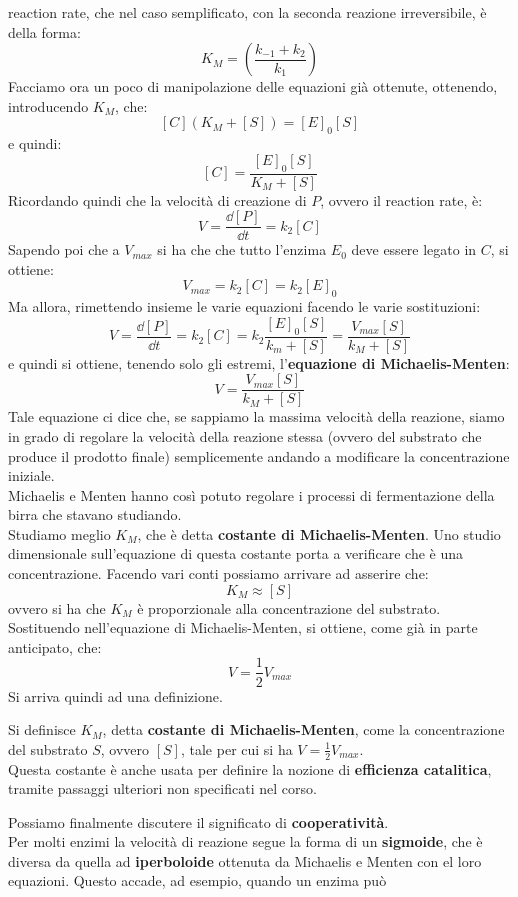 \documentclass[a4paper,12pt, oneside]{book}
\begin{document}
reaction rate, che nel caso semplificato, con la seconda reazione irreversibile,
è della forma:
\[K_M=\left(\frac{k_{-1}+k_2}{k_1}\right)\]
Facciamo ora un poco di manipolazione delle equazioni già ottenute, ottenendo,
introducendo $K_M$, che:
\[[C](K_M+[S])=[E]_0[S]\]
e quindi:
\[[C]=\frac{[E]_0[S]}{K_M+[S]}\]
Ricordando quindi che la velocità di creazione di $P$, ovvero il reaction rate,
è:
\[V=\frac{\dd{[P]}}{\dd{t}}=k_2[C]\]
Sapendo poi che a $V_{max}$ si ha che che tutto l'enzima $E_0$ deve essere
legato in $C$, si ottiene:
\[V_{max}=k_2[C]=k_2[E]_0\]
Ma allora, rimettendo insieme le varie equazioni facendo le varie sostituzioni:
\[V=\frac{\dd{[P]}}{\dd{t}}=k_2[C]=k_2\frac{[E]_0[S]}{k_m+[S]}=
  \frac{V_{max}[S]}{k_M+[S]}\]
e quindi si ottiene, tenendo solo gli estremi, l'\textbf{equazione di
  Michaelis-Menten}: 
\[V= \frac{V_{max}[S]}{k_M+[S]}\]
Tale equazione ci dice che, se sappiamo la massima velocità della reazione,
siamo in grado di regolare la velocità della reazione stessa (ovvero del
substrato che produce il prodotto finale) semplicemente
andando a modificare la concentrazione iniziale.\\
Michaelis e Menten hanno così potuto regolare i processi di fermentazione della
birra che stavano studiando.\\
Studiamo meglio $K_M$, che è detta \textbf{costante di Michaelis-Menten}. Uno
studio dimensionale sull'equazione di questa costante porta a verificare che è
una concentrazione. Facendo vari conti possiamo arrivare ad asserire che:
\[K_M\approx [S]\]
ovvero si ha che $K_M$ è proporzionale alla concentrazione del substrato.\\
Sostituendo nell'equazione di Michaelis-Menten, si ottiene, come
già in parte anticipato, che:
\[V=\frac{1}{2}V_{max}\]
Si arriva quindi ad una definizione.
\begin{definizione}
  Si definisce $K_M$, detta \textbf{costante di Michaelis-Menten}, come
  la concentrazione del substrato $S$, ovvero $[S]$, tale per cui si ha
  $V=\frac{1}{2}V_{max}$.\\ 
  Questa costante è anche usata per definire la nozione di \textbf{efficienza
    catalitica}, tramite passaggi ulteriori non specificati nel corso. 
\end{definizione}
Possiamo finalmente discutere il significato di \textbf{cooperatività}.\\
Per molti enzimi la velocità di reazione segue la forma di un \textbf{sigmoide},
che è diversa da quella ad \textbf{iperboloide} ottenuta da Michaelis e
Menten con el loro equazioni. Questo accade, ad esempio, quando un enzima può
\end{document}
